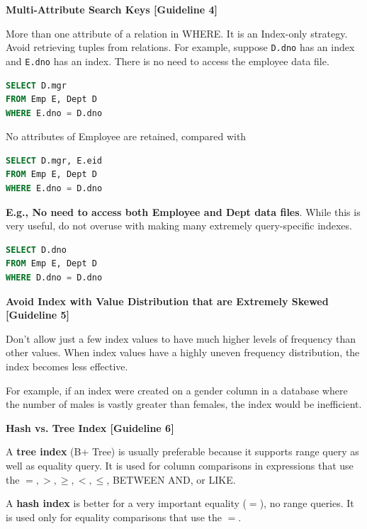 \documentclass[11pt]{article}
\newcommand{\vs}[]{
    \vspace{11pt}
}
\newcommand{\boldsec}[1]{
    \vspace{11pt}
    \textbf{#1}
    \vspace{11pt}
}
\newcommand{\boldsecbottom}[1]{
    \textbf{#1}
    \vspace{11pt}
}
\begin{document}
\boldsecbottom{Multi-Attribute Search Keys [Guideline 4]}

More than one attribute of a relation in WHERE. It is an Index-only strategy. Avoid retrieving tuples from relations. For example, suppose \texttt{D.dno} has an index and \texttt{E.dno} has an index. There is no need to access the employee data file.

\vs
\begin{lstlisting}[language=sql, breaklines=true, showstringspaces=false]
SELECT D.mgr
FROM Emp E, Dept D
WHERE E.dno = D.dno
\end{lstlisting}
\vs

No attributes of Employee are retained, compared with

\vs
\begin{lstlisting}[language=sql, breaklines=true, showstringspaces=false]
SELECT D.mgr, E.eid
FROM Emp E, Dept D
WHERE E.dno = D.dno
\end{lstlisting}
\vs

\textbf{E.g., No need to access both Employee and Dept data files}. While this is very useful, do not overuse with making many extremely query-specific indexes.

\vs
\begin{lstlisting}[language=sql, breaklines=true, showstringspaces=false]
SELECT D.dno
FROM Emp E, Dept D
WHERE D.dno = D.dno
\end{lstlisting}
\vs

\boldsecbottom{Avoid Index with Value Distribution that are Extremely Skewed [Guideline 5]}

Don't allow just a few index values to have much higher levels of frequency than other values. When index values have a highly uneven frequency distribution, the index becomes less effective.

For example, if an index were created on a gender column in a database where the number of males is vastly greater than females, the index would be inefficient.

\boldsec{Hash vs. Tree Index [Guideline 6]}

A \textbf{tree index} (B+ Tree) is usually preferable because it supports range query as well as equality query. It is used for column comparisons in expressions that use the $=,>,\geq, <,\leq$, BETWEEN AND, or LIKE.

A \textbf{hash index} is better for a very important equality ($=$), no range queries. It is used only for equality comparisons that use the $=$.
\end{document}
